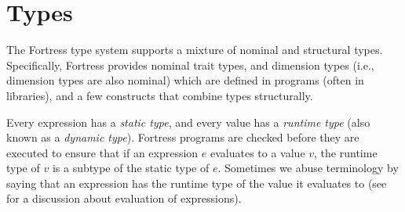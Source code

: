 %
%
%
%

\chapter{Types}



The Fortress type system supports a mixture of nominal and structural types.
Specifically,
Fortress provides nominal trait types,
and dimension types (i.e., dimension types are also nominal)
which are defined in programs (often in libraries),
and a few constructs that combine types structurally.

Every expression has a \emph{static type},
and every value has a \emph{runtime type}
(also known as a \emph{dynamic type}).
Fortress programs are checked before they are executed to ensure that if
an expression $e$ evaluates to a value $v$, the runtime type of $v$ is a
subtype of the static type of $e$.
Sometimes we abuse terminology by saying that
an expression has the runtime type of the value it evaluates to
(see  for a discussion about evaluation of expressions).

